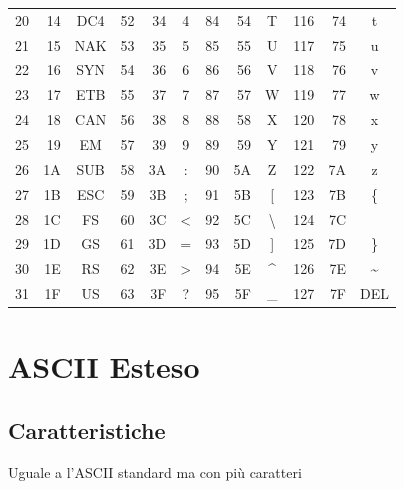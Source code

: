 \begin{table}[htbp]
\begin{tabular}{rrc|rrc|rrc|rrc}
20 & 14 & DC4 & 52 & 34 & 4   & 84  & 54 & T  & 116 & 74 & t \\
21 & 15 & NAK & 53 & 35 & 5   & 85  & 55 & U  & 117 & 75 & u \\
22 & 16 & SYN & 54 & 36 & 6   & 86  & 56 & V  & 118 & 76 & v \\
23 & 17 & ETB & 55 & 37 & 7   & 87  & 57 & W  & 119 & 77 & w \\
24 & 18 & CAN & 56 & 38 & 8   & 88  & 58 & X  & 120 & 78 & x \\
25 & 19 & EM  & 57 & 39 & 9   & 89  & 59 & Y  & 121 & 79 & y \\
26 & 1A & SUB & 58 & 3A & :   & 90  & 5A & Z  & 122 & 7A & z \\
27 & 1B & ESC & 59 & 3B & ;   & 91  & 5B & [  & 123 & 7B & \{ \\
28 & 1C & FS  & 60 & 3C & \textless{}  & 92 & 5C & \textbackslash{} & 124 & 7C & \textbar{} \\
29 & 1D & GS  & 61 & 3D & =   & 93  & 5D & ]  & 125 & 7D & \} \\
30 & 1E & RS  & 62 & 3E & \textgreater{} & 94 & 5E & \textasciicircum{} & 126 & 7E & \textasciitilde{} \\
31 & 1F & US  & 63 & 3F & ?   & 95  & 5F & \_ & 127 & 7F & DEL \\
\bottomrule
\end{tabular}
\end{table}

\newpage
\section{ASCII Esteso}
\subsection{Caratteristiche}
Uguale a l'ASCII standard ma con più caratteri

